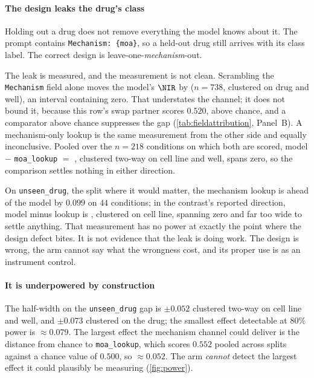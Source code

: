 \paragraph{The design leaks the drug's class} Holding out a drug does not
remove everything the model knows about it. The prompt contains
\texttt{Mechanism: \{moa\}}, so a held-out drug still arrives with its class
label. The correct design is leave-one-\emph{mechanism}-out.

The leak is measured, and the measurement is not clean. Scrambling the
\texttt{Mechanism} field alone moves the model's $\NIR$ by
 ($n = \num{738}$, clustered on drug and well), an
interval containing zero. That understates the channel; it does not bound it,
because this row's swap partner scores $0.520$, above chance, and a comparator
above chance suppresses the gap (\cref{tab:fieldattribution}, Panel~B). A
mechanism-only lookup is the same measurement from the other side and equally
inconclusive. Pooled over the $n = \num{218}$ conditions on which both are
scored, model $-$ \texttt{moa\_lookup} $=$ ,
clustered two-way on cell line and well, spans zero, so the comparison settles
nothing in either direction.

On \texttt{unseen\_drug}, the split where it would matter, the mechanism lookup
is ahead of the model by $0.099$ on $44$ conditions; in the contrast's reported
direction, model minus lookup is , clustered on cell
line, spanning zero and far too wide to settle anything. That measurement has no
power at exactly the point where the design defect bites. It is not evidence
that the leak is doing work. The design is wrong, the arm cannot say what the
wrongness cost, and its proper use is as an instrument control.

\paragraph{It is underpowered by construction} The half-width on the
\texttt{unseen\_drug} gap is $\pm 0.052$ clustered two-way on cell line and
well, and $\pm 0.073$ clustered on the drug; the smallest effect detectable at
$80\%$ power is $\approx 0.079$. The largest effect the mechanism channel could
deliver is the distance from chance to \texttt{moa\_lookup}, which scores
$0.552$ pooled across splits against a chance value of $0.500$, so $\approx
0.052$. The arm \emph{cannot} detect the largest effect it could plausibly be
measuring (\cref{fig:power}).

